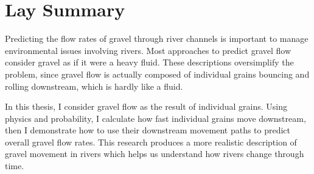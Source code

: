 

\chapter{Lay Summary}

Predicting the flow rates of gravel through river channels is important to manage environmental issues involving rivers.
Most approaches to predict gravel flow consider gravel as if it were a heavy fluid.
These descriptions oversimplify the problem, since gravel flow is actually composed of individual grains bouncing and rolling downstream, which is hardly like a fluid.

In this thesis, I consider gravel flow as the result of individual grains. Using physics and probability, I calculate how fast individual grains move downstream, then I demonstrate how to use their downstream movement paths to predict overall gravel flow rates.
This research produces a more realistic description of gravel movement in rivers which helps us understand how rivers change through time.

